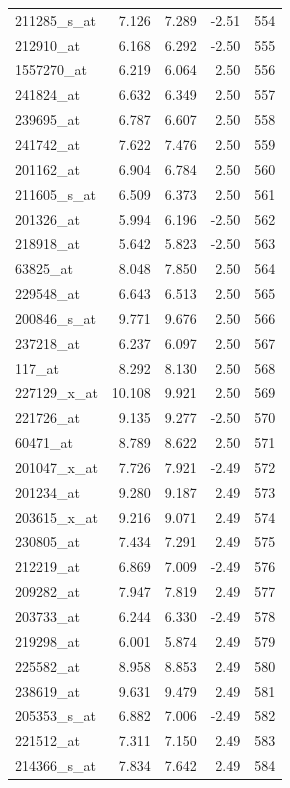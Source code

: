 \begin{footnotesize}
\begin{longtable}{lrrrr}
211285\_s\_at & 7.126 & 7.289 & -2.51 & 554 \\
212910\_at & 6.168 & 6.292 & -2.50 & 555 \\
1557270\_at & 6.219 & 6.064 & 2.50 & 556 \\
241824\_at & 6.632 & 6.349 & 2.50 & 557 \\
239695\_at & 6.787 & 6.607 & 2.50 & 558 \\
241742\_at & 7.622 & 7.476 & 2.50 & 559 \\
201162\_at & 6.904 & 6.784 & 2.50 & 560 \\
211605\_s\_at & 6.509 & 6.373 & 2.50 & 561 \\
201326\_at & 5.994 & 6.196 & -2.50 & 562 \\
218918\_at & 5.642 & 5.823 & -2.50 & 563 \\
63825\_at & 8.048 & 7.850 & 2.50 & 564 \\
229548\_at & 6.643 & 6.513 & 2.50 & 565 \\
200846\_s\_at & 9.771 & 9.676 & 2.50 & 566 \\
237218\_at & 6.237 & 6.097 & 2.50 & 567 \\
117\_at & 8.292 & 8.130 & 2.50 & 568 \\
227129\_x\_at & 10.108 & 9.921 & 2.50 & 569 \\
221726\_at & 9.135 & 9.277 & -2.50 & 570 \\
60471\_at & 8.789 & 8.622 & 2.50 & 571 \\
201047\_x\_at & 7.726 & 7.921 & -2.49 & 572 \\
201234\_at & 9.280 & 9.187 & 2.49 & 573 \\
203615\_x\_at & 9.216 & 9.071 & 2.49 & 574 \\
230805\_at & 7.434 & 7.291 & 2.49 & 575 \\
212219\_at & 6.869 & 7.009 & -2.49 & 576 \\
209282\_at & 7.947 & 7.819 & 2.49 & 577 \\
203733\_at & 6.244 & 6.330 & -2.49 & 578 \\
219298\_at & 6.001 & 5.874 & 2.49 & 579 \\
225582\_at & 8.958 & 8.853 & 2.49 & 580 \\
238619\_at & 9.631 & 9.479 & 2.49 & 581 \\
205353\_s\_at & 6.882 & 7.006 & -2.49 & 582 \\
221512\_at & 7.311 & 7.150 & 2.49 & 583 \\
214366\_s\_at & 7.834 & 7.642 & 2.49 & 584 \\

\end{longtable}
\end{footnotesize}
